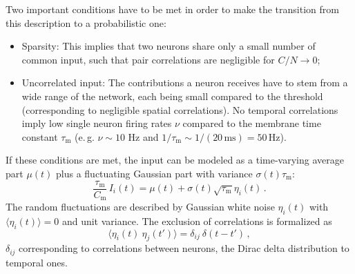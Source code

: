 Two important conditions have to be met in order to make the transition from 
this description to a probabilistic one:
\begin{itemize}
    \item Sparsity: This implies that 
        two neurons share only a small number of common input, such that pair correlations
        are negligible for $C / N \to 0$; 
    \item Uncorrelated input: The contributions a neuron receives have to stem from 
        a wide range of the network, each being small compared to the threshold
        (corresponding to negligible spatial correlations). 
        No temporal correlations imply low single neuron firing rates $\nu$ compared 
        to the membrane time constant $\tau_\text{m}$
        (e.\,g. $\nu \sim10$ Hz and $1 / \tau_\text{m} \sim 1 / (20\,\text{ms}) = 50\, \text{Hz}$).
\end{itemize}
If these conditions are met, the input can be modeled as a time-varying average part
$\mu(t)$ plus a fluctuating Gaussian part with variance $\sigma(t)\tau_\text{m}$:
\begin{equation}
    \frac{\tau_\text{m}}{C_\text{m}} \, I_i(t) =  \mu(t) + \sigma(t) \sqrt{\tau_\text{m}} \eta_i(t) \, .
    \label{eq:input_random}
\end{equation}
The random fluctuations are described by Gaussian white noise $\eta_i(t)$ with 
$\langle  \eta_i(t)\rangle = 0$ and unit variance. 
The exclusion of correlations is formalized as  
\begin{equation}
    \langle \eta_i(t) \: \eta_j(t') \rangle = \delta_{ij} \: \delta(t - t')	\, ,
    \label{eq:no_correlations}
\end{equation}
$\delta_{ij}$ corresponding to correlations between neurons, 
the Dirac delta distribution to temporal ones. 


